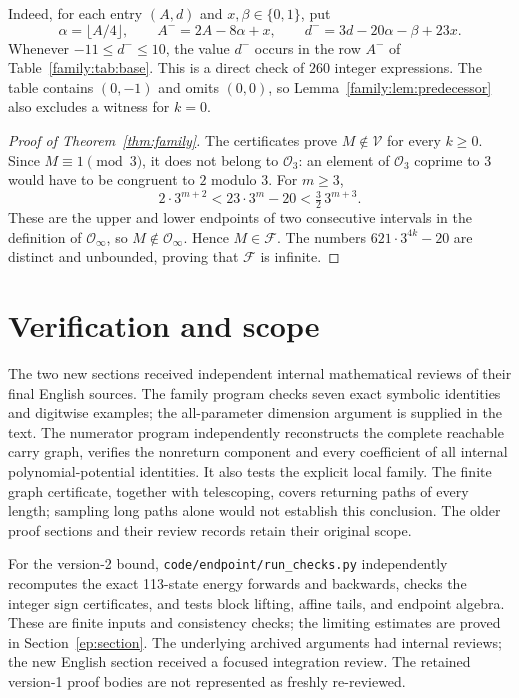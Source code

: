 \documentclass[11pt]{article}
\theoremstyle{remark}
\newcommand{\Obloc}{\mathcal O_3}
\newcommand{\Obreal}{\mathcal O_\infty}
\newcommand{\F}{\mathcal F}
\newcommand{\bits}{\{0,1\}}
\begin{document}
Indeed, for each entry $(A,d)$ and $x,\beta\in\bits$, put
\[
 \alpha=\lfloor A/4\rfloor,\qquad
 A^-=2A-8\alpha+x,\qquad d^-=3d-20\alpha-\beta+23x.
\]
Whenever $-11\le d^-\le10$, the value $d^-$ occurs in the row
$A^-$ of Table~\ref{family:tab:base}. This is a direct check of $260$
integer expressions. The table contains $(0,-1)$ and omits $(0,0)$,
so Lemma~\ref{family:lem:predecessor} also excludes a witness for $k=0$.

\begin{proof}[Proof of Theorem~\ref{thm:family}]
The certificates prove $M\notin\mathcal V$ for every $k\ge0$.
Since $M\equiv1\pmod3$, it does not belong to $\Obloc$: an element of
$\Obloc$ coprime to $3$ would have to be congruent to $2$ modulo $3$.
For $m\ge3$,
\[
       2\cdot3^{m+2}<23\cdot3^m-20<\tfrac32\,3^{m+3}.
\]
These are the upper and lower endpoints of two consecutive intervals
in the definition of $\Obreal$, so $M\notin\Obreal$. Hence $M\in\F$.
The numbers $621\cdot3^{4k}-20$ are distinct and unbounded, proving
that $\F$ is infinite.
\end{proof}




\section{Verification and scope}

The two new sections received independent internal mathematical reviews
of their final English sources. The family
program checks seven exact symbolic identities and digitwise examples;
the all-parameter dimension argument is supplied in the text. The
numerator program independently reconstructs the complete reachable
carry graph, verifies the nonreturn component and every coefficient of
all internal polynomial-potential identities. It also tests the explicit
local family. The finite graph certificate, together with telescoping,
covers returning paths of every length; sampling long paths alone would
not establish this conclusion. The older proof sections and their review
records retain their original scope.


For the version-2 bound, \texttt{code/endpoint/run\_checks.py} independently
recomputes the exact 113-state energy forwards and backwards, checks
the integer sign certificates, and tests block lifting, affine tails,
and endpoint algebra. These are finite inputs and consistency checks;
the limiting estimates are proved in Section~\ref{ep:section}.
The underlying archived arguments had internal reviews; the new
English section received a focused integration review. The retained
version-1 proof bodies are not represented as freshly re-reviewed.
\end{document}
